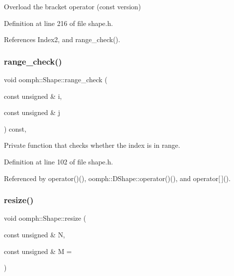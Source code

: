 Overload the bracket operator (const version) 



Definition at line 216 of file shape.\+h.



References Index2, and range\+\_\+check().

\mbox{\label{classoomph_1_1Shape_af24aed6aba597ff8cd52d201be5a414a}} 
\subsubsection{\texorpdfstring{range\+\_\+check()}{range\_check()}}
{\footnotesize\ttfamily void oomph\+::\+Shape\+::range\+\_\+check (\begin{DoxyParamCaption}\item[{const unsigned \&}]{i,  }\item[{const unsigned \&}]{j }\end{DoxyParamCaption}) const\hspace{0.3cm}{\ttfamily [inline]}, {\ttfamily [protected]}}



Private function that checks whether the index is in range. 



Definition at line 102 of file shape.\+h.



Referenced by operator()(), oomph\+::\+D\+Shape\+::operator()(), and operator\mbox{[}$\,$\mbox{]}().

\mbox{\label{classoomph_1_1Shape_a701caf3197248f0e4f598ede06f0d4ec}} 
\subsubsection{\texorpdfstring{resize()}{resize()}}
{\footnotesize\ttfamily void oomph\+::\+Shape\+::resize (\begin{DoxyParamCaption}\item[{const unsigned \&}]{N,  }\item[{const unsigned \&}]{M = {} }\end{DoxyParamCaption})\hspace{0.3cm}{\ttfamily [inline]}}



